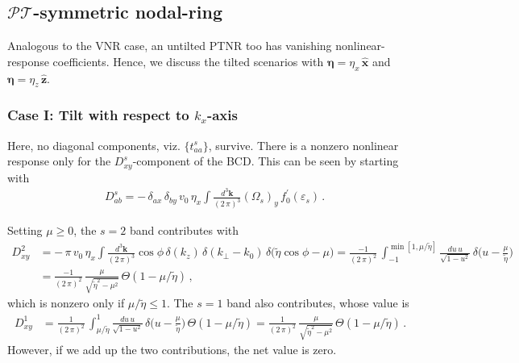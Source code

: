 \documentclass[aps,prb,onecolumn,nofootinbib,citeautoscript,10pt]{revtex4-2}
\newcommand{\bs}[1]{\boldsymbol{#1}}
\def \nn{\nonumber \\}
\begin{document}
 
\subsection{${\mathcal P} {\mathcal T}$-symmetric nodal-ring}

Analogous to the VNR case, an untilted PTNR too has vanishing nonlinear-response coefficients. Hence, we discuss the tilted scenarios with $\bs \eta = \eta_x \,\bs{\hat x} $ and $ \bs \eta = \eta_z \,\bs{\hat z} $. 

\subsubsection{Case I: Tilt with respect to $ k_x $-axis}

Here, no diagonal components, viz. $\lbrace t^s_{aa} \rbrace $, survive. There is a nonzero nonlinear response only for the $D^s_{xy}$-component of the BCD. This can be seen by starting with
\begin{align}
& D^s_{ab} =  - \,\delta_{a x} \,\delta_{b y} \, v_0\,\eta_x 
 \int \frac{ d^3 \bs k}{(2\, \pi)^3 }  \left( \Omega_s \right)_y \, f^{\prime}_0 (\varepsilon_s)\,.
\end{align} 

Setting $\mu \geq 0$, the $s=2$ band contributes with
\begin{align}
D^2_{xy} & = - \,\pi \, v_0\,\eta_x
\int \frac{ d^3 \bs k}{(2\, \pi)^3 }   
 \cos \phi  \,\delta(k_z)\,\delta(k_\perp-k_0)\,\delta \big( \tilde \eta \cos \phi  -\mu \big)
=  \frac{-1 } {(2\, \pi)^2} \,\int_{-1}^{\min[1, \mu/\tilde \eta ] } \frac{du  \, u} { \sqrt{1-u^2} }  
\, \delta \Big( u -\frac{\mu} {\tilde \eta} \Big )
\nn & = \frac{ -1 } {(2\, \pi)^2} \,\frac{\mu} {\sqrt{ {\tilde \eta}^2 -\mu^2}} 
\,\Theta(1-\mu/{\tilde \eta})\,,
\end{align}
which is nonzero only if $\mu/\tilde \eta \leq 1$. The $s=1$ band also contributes, whose value is
\begin{align}
D^1_{xy} & =  \frac{1 } {(2\, \pi)^2} \,\int^{1}_{\mu/\tilde \eta} \frac{du  \, u} { \sqrt{1-u^2} }  
\, \delta \Big( u -\frac{\mu} {\tilde \eta} \Big ) \,\Theta(1-\mu/{\tilde \eta})
 = \frac{ 1 } {(2\, \pi)^2} \,\frac{\mu} {\sqrt{ {\tilde \eta}^2 -\mu^2}} \,\Theta(1-\mu/{\tilde \eta})\,.
\end{align}
However, if we add up the two contributions, the net value is zero.
\end{document}
